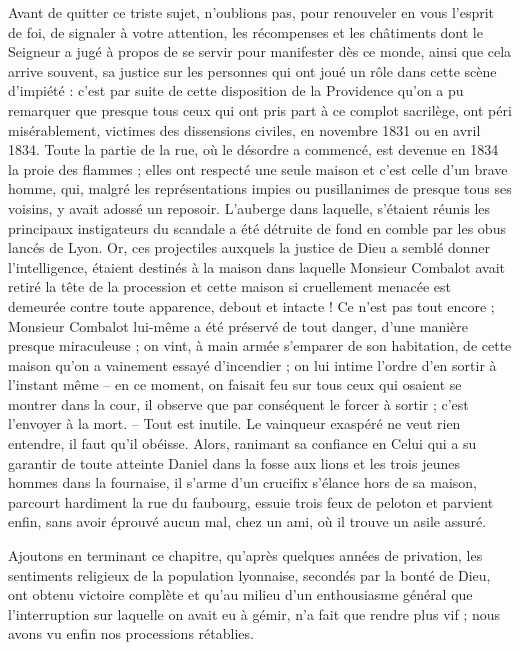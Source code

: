 \documentclass[11pt,a4paper]{report}
\begin{document}
Avant de quitter ce triste sujet, n'oublions pas, pour renouveler en vous l'esprit de foi, de signaler à votre attention, les récompenses et les châtiments dont le Seigneur a jugé à propos de se servir pour manifester dès ce monde, ainsi que cela arrive souvent, sa justice sur les personnes qui ont joué un rôle dans cette scène d'impiété : c'est par suite de cette disposition de la Providence qu'on a pu remarquer que presque tous ceux qui ont pris part à ce complot sacrilège, ont péri misérablement, victimes des dissensions civiles, en novembre 1831 ou en avril 1834. Toute la partie de la rue, où le désordre a commencé, est devenue en 1834 la proie des flammes ; elles ont respecté une seule maison et c'est celle d'un brave homme, qui, malgré les représentations impies ou pusillanimes de presque tous ses voisins, y avait adossé un reposoir. L'auberge dans laquelle, s'étaient réunis les principaux instigateurs du scandale a été détruite de fond en comble par les obus lancés de Lyon. Or, ces projectiles auxquels la justice de Dieu a semblé donner l'intelligence, étaient destinés à la maison dans laquelle Monsieur Combalot avait retiré la tête de la procession et cette maison si cruellement menacée est demeurée contre toute apparence, debout et intacte ! Ce n'est pas tout encore ; Monsieur Combalot lui-même a été préservé de tout danger, d'une manière presque miraculeuse ; on vint, à main armée s'emparer de son habitation, de cette maison qu'on a vainement essayé d'incendier ; on lui intime l'ordre d'en sortir à l'instant même -- en ce moment, on faisait feu sur tous ceux qui osaient se montrer dans la cour, il observe que par conséquent le forcer à sortir ; c'est l'envoyer à la mort. -- Tout est inutile. Le vainqueur exaspéré ne veut rien entendre, il faut qu'il obéisse. Alors, ranimant sa confiance en Celui qui a su garantir de toute atteinte Daniel dans la fosse aux lions et les trois jeunes hommes dans la fournaise, il s'arme d'un crucifix s'élance hors de sa maison, parcourt hardiment la rue du faubourg, essuie trois feux de peloton et parvient enfin, sans avoir éprouvé aucun mal, chez un ami, où il trouve un asile assuré.

Ajoutons en terminant ce chapitre, qu'après quelques années de privation, les sentiments religieux de la population lyonnaise, secondés par la bonté de Dieu, ont obtenu victoire complète et qu'au milieu d'un enthousiasme général que l'interruption sur laquelle on avait eu à gémir, n'a fait que rendre plus vif ; nous avons vu enfin nos processions rétablies.
\end{document}

